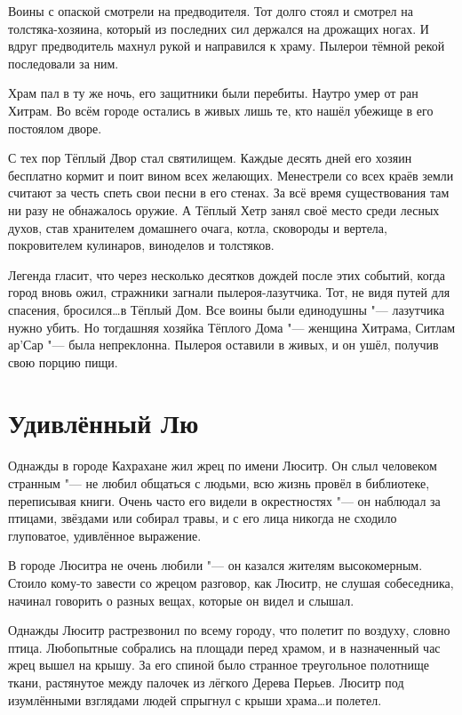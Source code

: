 \documentclass[a4paper,10pt]{book}
\begin{document}
Воины с опаской смотрели на предводителя. Тот долго стоял и смотрел на 
толстяка-хозяина, который из последних сил держался на дрожащих ногах. И вдруг 
предводитель махнул рукой и направился к храму. Пылерои тёмной рекой 
последовали за ним.

Храм пал в ту же ночь, его защитники были перебиты. Наутро умер от ран Хитрам. 
Во всём городе остались в живых лишь те, кто нашёл убежище в его постоялом 
дворе.

С тех пор Тёплый Двор стал святилищем. Каждые десять дней его хозяин бесплатно 
кормит и поит вином всех желающих. Менестрели со всех краёв земли считают за 
честь спеть свои песни в его стенах. За всё время существования там ни разу не 
обнажалось оружие. А Тёплый Хетр занял своё место среди лесных духов, став 
хранителем домашнего очага, котла, сковороды и вертела, покровителем кулинаров, 
виноделов и толстяков.

Легенда гласит, что через несколько десятков дождей после этих событий, когда 
город вновь ожил, стражники загнали пылероя-лазутчика. Тот, не видя путей для 
спасения, бросился\dots в Тёплый Дом. Все воины были единодушны "--- лазутчика 
нужно убить. Но тогдашняя хозяйка Тёплого Дома "--- женщина Хитрама, Ситлам 
ар’Сар 
"--- была непреклонна. Пылероя оставили в живых, и он ушёл, получив свою порцию 
пищи.

\section{Удивлённый Лю}

Однажды в городе Кахрахане жил жрец по имени Люситр. Он слыл человеком странным 
"--- не любил общаться с людьми, всю жизнь провёл в библиотеке, переписывая 
книги. Очень часто его видели в окрестностях "--- он наблюдал за птицами, 
звёздами или собирал травы, и с его лица никогда не сходило глуповатое, 
удивлённое выражение.

В городе Люситра не очень любили "--- он казался жителям высокомерным. Стоило 
кому-то завести со жрецом разговор, как Люситр, не слушая собеседника, начинал 
говорить о разных вещах, которые он видел и слышал.

Однажды Люситр растрезвонил по всему городу, что полетит по воздуху, словно 
птица. Любопытные собрались на площади перед храмом, и в назначенный час жрец 
вышел на крышу. За его спиной было странное треугольное полотнище ткани, 
растянутое между палочек из лёгкого Дерева Перьев. Люситр под изумлёнными 
взглядами людей спрыгнул с крыши храма\dots и полетел.
\end{document}
